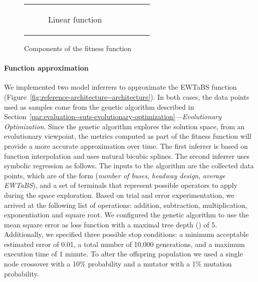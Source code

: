 \begin{figure}[h]
\begin{tabular}{c c c c}
		\begin{subfigure}{.5\textwidth}
			\centering
			\resizebox{0.7\columnwidth}{!}{%
				\begin{tikzpicture}
					\begin{axis}[
						axis lines=center,
						grid = both,
						minor tick num=1,
						major grid style={lightgray},
						minor grid style={lightgray!25},
						width=1\textwidth]
						\addplot[domain = 0:36, samples = 200, smooth, thick, blue] {-x};
					\end{axis}
				\end{tikzpicture}
			}
			\caption{Linear function}
			\label{fig:evaluation--suts-fitness-function-linear}
		\end{subfigure}
	\end{tabular}
	\label{fig:evaluation--suts-fitness-function}
	\caption{Components of the fitness function}
\end{figure}

\paragraph{Function approximation}
\label{par:evaluation--suts-function-approximation}

We implemented two model inferrers to approximate the \gls{EWTaBS} function (\cf Figure~\ref{fig:reference-architecture--architecture}). In both cases, the data points used as samples come from the genetic algorithm described in Section~\ref{par:evaluation--suts-evolutionary-optimization}---\emph{Evolutionary Optimization}. Since the genetic algorithm explores the solution space, from an evolutionary viewpoint, the metrics computed as part of the fitness function will provide a more accurate approximation over time. The first inferrer is based on function interpolation and uses natural bicubic splines. The second inferrer uses symbolic regression as follows. The inputs to the algorithm are the collected data points, which are of the form (\emph{number of buses}, \emph{headway design}, \emph{average \gls{EWTaBS}}), and a set of terminals that represent possible operators to apply during the space exploration. Based on trial and error experimentation, we arrived at the following list of operations: addition, subtraction, multiplication, exponentiation and square root. We configured the genetic algorithm to use the mean square error as loss function with a maximal tree depth () of 5. Additionally, we specified three possible stop conditions: a minimum acceptable estimated error of 0.01, a total number of 10,000 generations, and a maximum execution time of 1 minute. To alter the offspring population we used a single node crossover with a 10\% probability and a mutator with a 1\% mutation probability.

